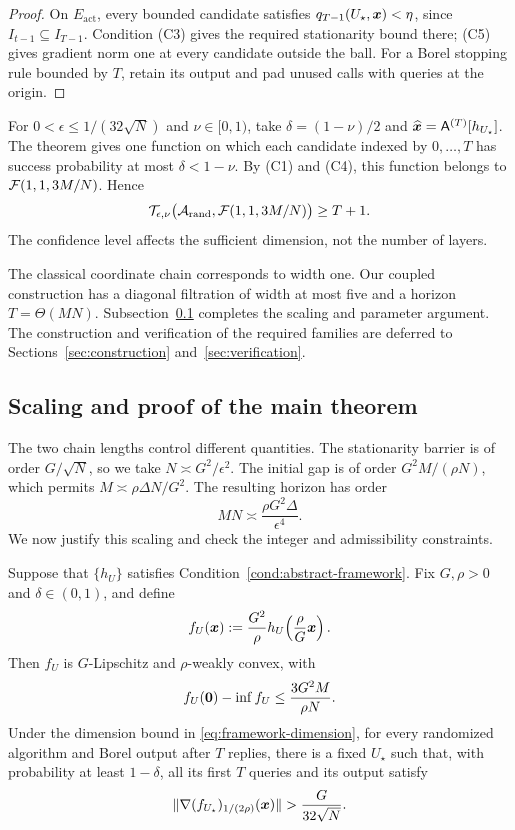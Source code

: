 \begin{proof}
On $E_{\mathrm{act}}$, every bounded candidate satisfies
$q_{T-1}(U_\star,\bm{x})<\eta$, since
$I_{t-1}\subseteq I_{T-1}$. Condition \textnormal{(C3)} gives
the required stationarity bound there; \textnormal{(C5)} gives
gradient norm one at every candidate outside the ball.
For a Borel stopping rule bounded by $T$, retain its output and
pad unused calls with queries at the origin.
\end{proof}

For $0<\epsilon\le1/(32\sqrt N)$ and $\nu\in[0,1)$, take
$\delta=(1-\nu)/2$ and
$\widehat{\bm{x}}={\mathsf{A}}^{(T)}[h_{U_\star}]$.
The theorem gives one function on which each candidate indexed
by $0,\ldots,T$ has success probability at most
$\delta<1-\nu$. By \textnormal{(C1)} and \textnormal{(C4)},
this function belongs to
${\cal F}(1,1,3M/N)$. Hence
\begin{equation}
 {\cal T}_{\epsilon,\nu}
 \bigl({\cal A}_{\operatorname{rand}},{\cal F}(1,1,3M/N)\bigr)
 \geq T+1.
 \label{eq:framework-complexity}
\end{equation}
The confidence level affects the sufficient dimension, not the
number of layers.

The classical coordinate chain corresponds to width one.
Our coupled construction has a diagonal filtration of width
at most five and a horizon $T=\Theta(MN)$.
Subsection~\ref{subsec:scaling-reduction} completes the scaling and
parameter argument. The construction and verification of the required
families are deferred to Sections~\ref{sec:construction}
and~\ref{sec:verification}.

\endgroup




\subsection{Scaling and proof of the main theorem}
\label{subsec:scaling-reduction}
\label{sec:proof-main}

The two chain lengths control different quantities. The stationarity
barrier is of order $G/\sqrt N$, so we take
$N\asymp G^2/\epsilon^2$. The initial gap is of order
$G^2M/(\rho N)$, which permits $M\asymp\rho\Delta N/G^2$.
The resulting horizon has order
\[
 MN\asymp\frac{\rho G^2\Delta}{\epsilon^4}.
\]
We now justify this scaling and check the integer and admissibility
constraints.
\begin{lemma}[Scaling]
\label{lem:scaling}
Suppose that $\{h_U\}$ satisfies
Condition~\ref{cond:abstract-framework}. Fix $G,\rho>0$ and
$\delta\in(0,1)$, and define
\[
 f_U(\bm{x}):=\frac{G^2}{\rho}
 h_U\!\left(\frac\rho G\bm{x}\right).
\]
Then $f_U$ is $G$-Lipschitz and $\rho$-weakly convex, with
\[
 f_U({\mathbf 0})-\inf f_U\le\frac{3G^2M}{\rho N}.
\]
Under the dimension bound in \eqref{eq:framework-dimension},
for every randomized algorithm and Borel output after $T$ replies,
there is a fixed $U_\star$ such that, with probability at least
$1-\delta$, all its first $T$ queries and its output satisfy
\[
 \|\nabla(f_{U_\star})_{1/(2\rho)}(\bm{x})\|
 >\frac G{32\sqrt N}.
\]
\end{lemma}

